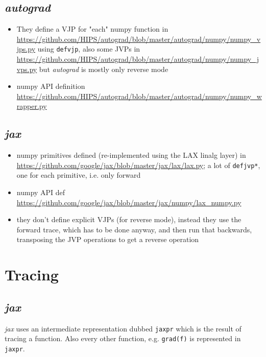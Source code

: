\documentclass[paper=a4,11pt,headsepline]{scrartcl}
\newcommand{\soft}[1]{\textsl{#1}\xspace}
\newcommand{\jax}{\soft{jax}}
\newcommand{\autograd}{\soft{autograd}}
\begin{document}
\subsection{\autograd}

\begin{itemize}
    \item They define a VJP for "each" numpy function in
        \url{https://github.com/HIPS/autograd/blob/master/autograd/numpy/numpy_vjps.py}
        using \texttt{defvjp}, also some JVPs in
        \url{https://github.com/HIPS/autograd/blob/master/autograd/numpy/numpy_jvps.py}
        but \autograd is mostly only reverse mode
    \item numpy API definition
        \url{https://github.com/HIPS/autograd/blob/master/autograd/numpy/numpy_wrapper.py}
\end{itemize}

\subsection{\jax}

\begin{itemize}
    \item numpy primitives defined (re-implemented using the LAX linalg layer) in
        \url{https://github.com/google/jax/blob/master/jax/lax/lax.py};
        a lot of \texttt{defjvp*}, one for each primitive, i.e. only forward
    \item numpy API def
        \url{https://github.com/google/jax/blob/master/jax/numpy/lax_numpy.py}
    \item they don't define explicit VJPs (for reverse mode), instead they use
        the forward trace, which has to be done anyway, and then run that
        backwards, transposing the JVP operations to get a reverse operation
\end{itemize}

\section{Tracing}

\subsection{\jax}

\jax uses an intermediate representation
dubbed \texttt{jaxpr} which is the result of tracing a function. Also every
other function, e.g. \texttt{grad(f)} is represented in \texttt{jaxpr}.
\end{document}
